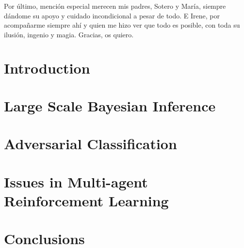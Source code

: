 \documentclass[a4paper, 11pt, openright, twoside]{reportPhD}
\numberwithin{figure}{chapter}
\numberwithin{table}{chapter}
\numberwithin{equation}{chapter}
\begin{document}
Por último, mención especial merecen mis padres, Sotero y María, siempre dándome su apoyo y cuidado incondicional a pesar de todo. E Irene, por acompañarme siempre ahí y quien me hizo ver que todo es posible, con toda su ilusión, ingenio y magia. Gracias, os quiero.


\indice
\indicetablas
\indicefiguras
\indicealgoritmos


\chapter{Introduction}\label{cha:intro}
\setcounter{page}{1}


\begin{subappendices}

\end{subappendices}



\chapter{Large Scale Bayesian Inference}\label{cha:bayes}


\begin{subappendices}

\end{subappendices}


\chapter{Adversarial Classification}\label{cha:adv}



\chapter{Issues in Multi-agent Reinforcement Learning}\label{cha:ararl}



\begin{subappendices}

\end{subappendices}


\chapter{Conclusions}\label{cha:conclusions}




{}
\newrefcontext[sorting=nty]

\printbibliography
\end{document}
